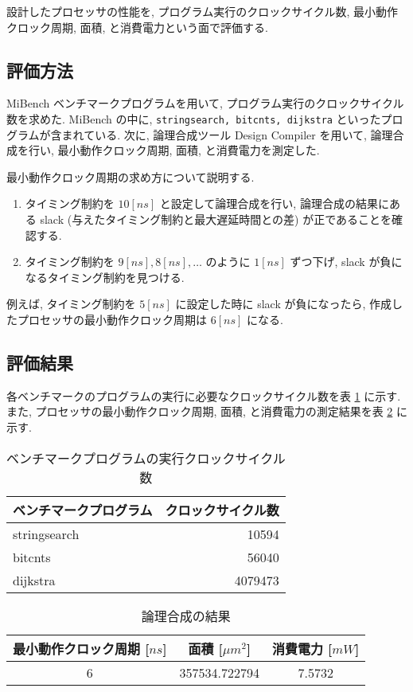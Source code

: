 \documentclass[../main.tex]{subfiles}
\begin{document}
  設計したプロセッサの性能を, プログラム実行のクロックサイクル数, 
  最小動作クロック周期, 面積, と消費電力という面で評価する.

  \subsection{評価方法}
  MiBench ベンチマークプログラムを用いて, プログラム実行のクロックサイクル数を求めた.
  MiBench の中に, \verb|stringsearch, bitcnts, dijkstra| といったプログラムが含まれている.
  次に, 論理合成ツール Design Compiler を用いて, 
  論理合成を行い, 最小動作クロック周期, 面積, と消費電力を測定した.

  最小動作クロック周期の求め方について説明する.
  \begin{enumerate}
    \item タイミング制約を $10[ns]$ と設定して論理合成を行い, 
    論理合成の結果にある slack (与えたタイミング制約と最大遅延時間との差) が正であることを確認する.
    \item タイミング制約を $9[ns], 8[ns], \dots$ のように $1[ns]$ ずつ下げ, 
    slack が負になるタイミング制約を見つける.
  \end{enumerate}

  例えば, タイミング制約を $5[ns]$ に設定した時に slack が負になったら, 
  作成したプロセッサの最小動作クロック周期は $6[ns]$ になる.

  \subsection{評価結果}
  各ベンチマークのプログラムの実行に必要なクロックサイクル数を表 \ref{table:mibench-base} に示す.
  また, プロセッサの最小動作クロック周期, 面積, と消費電力の測定結果を表 \ref{table:logic-synthesis-base} に示す.

  \begin{table}[h]
    \centering
    \begin{tabular}{|l|r|}
    \hline
    ベンチマークプログラム  & クロックサイクル数 \\ \hline
    stringsearch & 10594     \\
    bitcnts      & 56040     \\
    dijkstra     & 4079473   \\ \hline
    \end{tabular}
    \caption{ベンチマークプログラムの実行クロックサイクル数}
    \label{table:mibench-base}
  \end{table}

  \begin{table}[h]
    \centering
    \begin{tabular}{|c|c|c|}
    \hline
    最小動作クロック周期 {[}$ns${]} & 面積 {[}$\mu m^2${]} & 消費電力 {[}$mW${]} \\ \hline
    6                   & 357534.722794    & 7.5732        \\ \hline
    \end{tabular}
    \caption{論理合成の結果}
    \label{table:logic-synthesis-base}
  \end{table}
\end{document}
